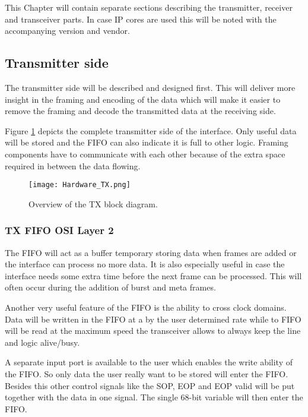 This Chapter will contain separate sections describing the transmitter, receiver and transceiver parts. In case IP cores are used this will be noted with the accompanying version and vendor.

\subsection{Transmitter side}
	The transmitter side will be described and designed first. This will deliver more insight in the framing and encoding of the data which will make it easier to remove the framing and decode the transmitted data at the receiving side.
	
	Figure \ref{Fig:Hardware_TX} depicts the complete transmitter side of the interface. Only useful data will be stored and the FIFO can also indicate it is full to other logic. Framing components have to communicate with each other because of the extra space required in between the data flowing. 
	\begin{figure}[H]
		\centering
		\texttt{[image: Hardware\_TX.png]}	
		\caption{Overview of the TX block diagram.}
		\label{Fig:Hardware_TX}
	\end{figure}
	
	\subsubsection[TX FIFO]{TX FIFO \hfill OSI Layer 2}
		The FIFO will act as a buffer temporary storing data when frames are added or the interface can process no more data. It is also especially useful in case the interface needs some extra time before the next frame can be processed. This will often occur during the addition of burst and meta frames.
		
		Another very useful feature of the FIFO is the ability to cross clock domains. Data will be written in the FIFO at a by the user determined rate while to FIFO will be read at the maximum speed the transceiver allows to always keep the line and logic alive/busy.
		
		A separate input port is available to the user which enables the write ability of the FIFO. So only data the user really want to be stored will enter the FIFO. Besides this other control signals like the SOP, EOP and EOP valid will be put together with the data in one signal. The single 68-bit variable will then enter the FIFO.
		
